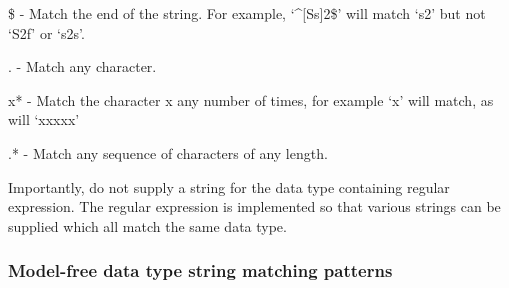     \$ - Match the end of the string.  For example, `\^{}[Ss]2\$' will match `s2' but not `S2f'
    or `s2s'.

    . - Match any character.

    x* - Match the character x any number of times, for example `x' will match, as will
    `xxxxx'

    .* - Match any sequence of characters of any length.

Importantly, do not supply a string for the data type containing regular expression.  The
regular expression is implemented so that various strings can be supplied which all match
the same data type.


\subsubsection{Model-free data type string matching patterns}




